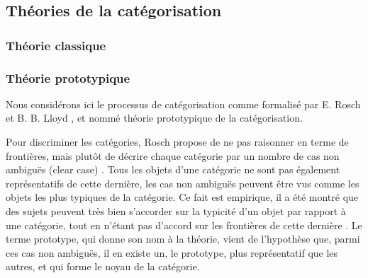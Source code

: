 \subsection{Théories de la catégorisation}


\subsubsection{Théorie classique}

\subsubsection{Théorie prototypique}

Nous considérons ici le processus de catégorisation comme formalisé par E. Rosch et B. B. Lloyd \citep{rosch1978cognition}, et nommé théorie prototypique de la catégorisation. 
 
Pour discriminer les catégories, Rosch propose de ne pas raisonner en terme de frontières, mais plutôt de décrire chaque catégorie par un nombre de cas non ambiguës (clear case) \citep[p. 36]{rosch1978cognition}. Tous les objets d'une catégorie ne sont pas également représentatifs de cette dernière, les cas non ambiguës peuvent être vus comme les objets les plus typiques de la catégorie. Ce fait est empirique, il a été montré que des sujets peuvent très bien s'accorder sur la typicité d'un objet par rapport à une catégorie, tout en n'étant pas d'accord sur les frontières de cette dernière \citep{rosch1974human,rosch1975cognitive}. Le terme prototype, qui donne son nom à la théorie, vient de l'hypothèse que, parmi ces cas non ambiguës, il en existe un, le prototype, plus représentatif que les autres, et qui forme le noyau de la catégorie.

